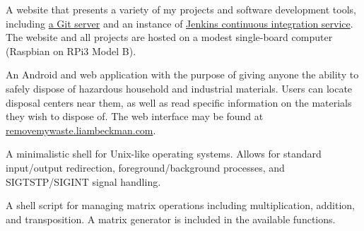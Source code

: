 \medbreak



A website that presents a variety of my projects and software development tools, including \href{https://git.liambeckman.com}{a Git server} and an instance of \href{https://liambeckman.com/jenkins}{Jenkins continuous integration service}. The website and all projects are hosted on a modest single-board computer (Raspbian on RPi3 Model B).

\myBreak


An Android and web application with the purpose of giving anyone the ability to safely dispose of hazardous household and industrial materials. Users can locate disposal centers near them, as well as read specific information on the materials they wish to dispose of. The web interface may be found at \textcolor{my-blue}{\href{https://removemywaste.liambeckman.com}{removemywaste.liambeckman.com}}.

\myBreak


A minimalistic shell for Unix-like operating systems. Allows for standard input/output redirection, foreground/background processes, and SIGTSTP/SIGINT signal handling.

\myBreak


A shell script for managing matrix operations including multiplication, addition, and transposition. A matrix generator is included in the available functions.

\myBreak


